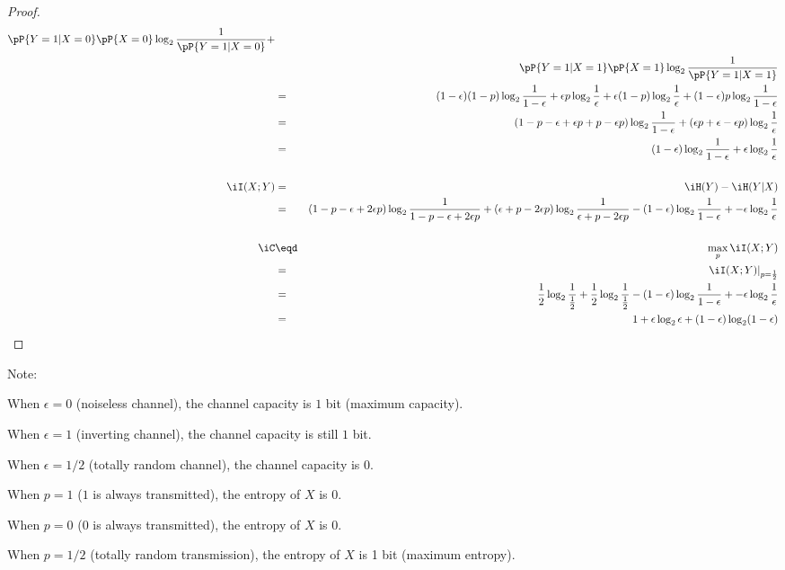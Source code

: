 \begin{proof}
\begin{eqnarray*}
           \pP{Y=1|X=0}\pP{X=0} \log_2 \frac{1}{\pP{Y=1|X=0}} + \\&&
           \pP{Y=1|X=1}\pP{X=1} \log_2 \frac{1}{\pP{Y=1|X=1}} 
  \\&=&    (1-\epsilon ) (1-p) \log_2 \frac{1}{1-\epsilon } +
           \epsilon      p     \log_2 \frac{1}{\epsilon   } +
           \epsilon      (1-p) \log_2 \frac{1}{\epsilon   } +
           (1-\epsilon ) p     \log_2 \frac{1}{1-\epsilon } 
  \\&=&    (1-p-\epsilon +\epsilon p+p-\epsilon p) \log_2 \frac{1}{1-\epsilon } +
           (\epsilon p+\epsilon -\epsilon p)   \log_2 \frac{1}{\epsilon   }
  \\&=&    (1-\epsilon ) \log_2 \frac{1}{1-\epsilon } +
           \epsilon      \log_2 \frac{1}{\epsilon   }
\\
\\
  \iI(X;Y)
    &=& \iH(Y) - \iH(Y|X)
  \\&=&    (1-p-\epsilon +2\epsilon p) \log_2 \frac{1}{1-p-\epsilon +2\epsilon p} + 
           (\epsilon +p-2\epsilon p)   \log_2 \frac{1}{\epsilon +p-2\epsilon p}
           - (1-\epsilon ) \log_2 \frac{1}{1-\epsilon } +
           - \epsilon      \log_2 \frac{1}{\epsilon   }
\\
\\
  \iC
    &\eqd& \max_p \iI(X;Y)
  \\&=&    \left. \iI(X;Y) \right|_{p=\frac{1}{2}}
  \\&=&    \frac{1}{2} \log_2 \frac{1}{\frac{1}{2}} + 
           \frac{1}{2} \log_2 \frac{1}{\frac{1}{2}}
           - (1-\epsilon ) \log_2 \frac{1}{1-\epsilon } +
           - \epsilon      \log_2 \frac{1}{\epsilon   }
  \\&=&    1  + \epsilon \log_2 \epsilon  + (1-\epsilon ) \log_2 (1-\epsilon )
\end{eqnarray*}
\end{proof}

Note:
\begin{liste}
  \item When $\epsilon =0$ (noiseless channel), the channel capacity is $1$ bit (maximum capacity).
  \item When $\epsilon=1$ (inverting channel), the channel capacity is still $1$ bit.
  \item When $\epsilon=1/2$ (totally random channel), the channel capacity is $0$.
  \item When $p=1$ ($1$ is always transmitted), the entropy of $X$ is $0$.
  \item When $p=0$ ($0$ is always transmitted), the entropy of $X$ is $0$.
  \item When $p=1/2$ (totally random transmission), the entropy of $X$ is 1 bit
        (maximum entropy).
\end{liste}



